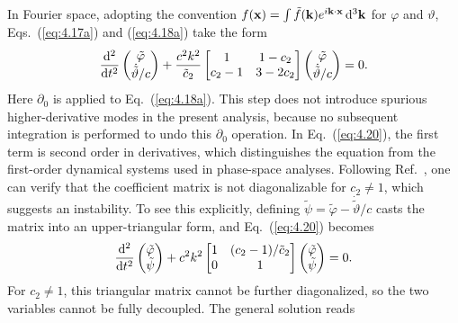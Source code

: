 \documentclass[aps,prd,twocolumn]{revtex4-2}
\newcommand\dx{{\rm d}}
\newcommand\p{\partial}
\begin{document}
In Fourier space, adopting the convention $f(\mathbf{x}) = \int \tilde{f}(\mathbf{k}) e^{i\mathbf{k}\cdot\mathbf{x}} \,\dx^3\mathbf{k}$ for $\varphi$ and $\vartheta$, Eqs.~(\ref{eq:4.17a}) and (\ref{eq:4.18a}) take the form
\begin{equation}\label{eq:4.20}
  \frac{\dx^2}{\dx t^2}
  \begin{pmatrix}
    \tilde{\varphi} \\
    \dot{\tilde{\vartheta}}/c 
  \end{pmatrix}
  +
  \frac{c^2k^2}{\tilde{c}_2}
  \begin{bmatrix}
    1  &  1-c_2  \\
    c_2-1  &  3-2c_2 
  \end{bmatrix}
  \begin{pmatrix}
    \tilde{\varphi} \\
    \dot{\tilde{\vartheta}}/c 
  \end{pmatrix}
  =
  0.
\end{equation}
Here $\p_0$ is applied to Eq.~(\ref{eq:4.18a}). This step does not introduce spurious higher-derivative modes in the present analysis, because no subsequent integration is performed to undo this $\p_0$ operation. In Eq.~(\ref{eq:4.20}), the first term is second order in derivatives, which distinguishes the equation from the first-order dynamical systems used in phase-space analyses. Following Ref.~\cite{Ganz2021.CQG.38.075005}, one can verify that the coefficient matrix is not diagonalizable for $c_2\neq1$, which suggests an instability. To see this explicitly, defining $\tilde{\psi}=\tilde{\varphi}-\dot{\tilde{\vartheta}}/c$ casts the matrix into an upper-triangular form, and Eq.~(\ref{eq:4.20}) becomes
\begin{equation}
  \frac{\dx^2}{\dx t^2}
  \begin{pmatrix}
    \tilde{\varphi} \\
    \tilde{\psi}
  \end{pmatrix}
  +
  c^2k^2
  \begin{bmatrix}
    1  &  (c_2-1)/\tilde{c}_2  \\
    0  &  1
  \end{bmatrix}
  \begin{pmatrix}
    \tilde{\varphi} \\
    \tilde{\psi}
  \end{pmatrix}
  =
  0.
\end{equation}
For $c_2\neq1$, this triangular matrix cannot be further diagonalized, so the two variables cannot be fully decoupled. The general solution reads
\end{document}
